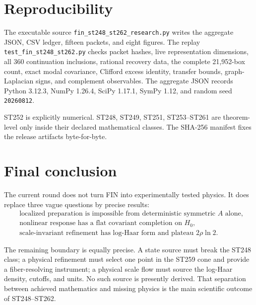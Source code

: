 \documentclass[11pt,a4paper]{article}
\begin{document}
\section{Reproducibility}

The executable source \texttt{fin\_st248\_st262\_research.py} writes the aggregate JSON,
CSV ledger, fifteen packets, and eight figures. The replay
\texttt{test\_fin\_st248\_st262.py} checks packet hashes, live representation dimensions,
all 360 continuation inclusions, rational recovery data, the complete 21,952-box count,
exact modal covariance, Clifford excess identity, transfer bounds, graph-Laplacian signs,
and complement observables. The aggregate JSON records Python 3.12.3, NumPy 1.26.4,
SciPy 1.17.1, SymPy 1.12, and random seed \texttt{20260812}.

ST252 is explicitly numerical. ST248, ST249, ST251, ST253--ST261 are theorem-level only
inside their declared mathematical classes. The SHA-256 manifest fixes the release
artifacts byte-for-byte.

\section{Final conclusion}

The current round does not turn FIN into experimentally tested physics. It does replace
three vague questions by precise results:
\begin{align*}
&\boxed{\text{localized preparation is impossible from deterministic symmetric }A\text{ alone}},\\
&\boxed{\text{nonlinear response has a flat covariant completion on }H_0},\\
&\boxed{\text{scale-invariant refinement has log-Haar form and plateau }2\rho\ln2}.
\end{align*}

The remaining boundary is equally precise. A state source must break the ST248 class; a
physical refinement must select one point in the ST259 cone and provide a fiber-resolving
instrument; a physical scale flow must source the log-Haar density, cutoffs, and units. No
such source is presently derived. That separation between achieved mathematics and missing
physics is the main scientific outcome of ST248--ST262.
\end{document}
